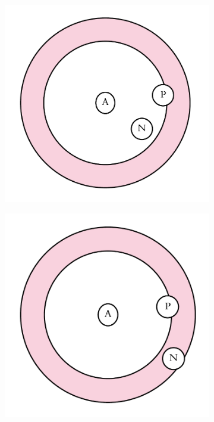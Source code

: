 \begin{figure}[ht]
	\centering
	\begin{subfigure}[t]{0.25\textwidth}
		\includegraphics[width=\linewidth]{imgs/triplet_loss_before.pdf}
		\subcaption{}\label{fig:triplet:a}
	\end{subfigure}%
	\hspace{1cm}%
	\begin{subfigure}[t]{0.25\textwidth}
		\includegraphics[width=\linewidth]{imgs/triplet_loss_during.pdf}

\end{subfigure}
\end{figure}

